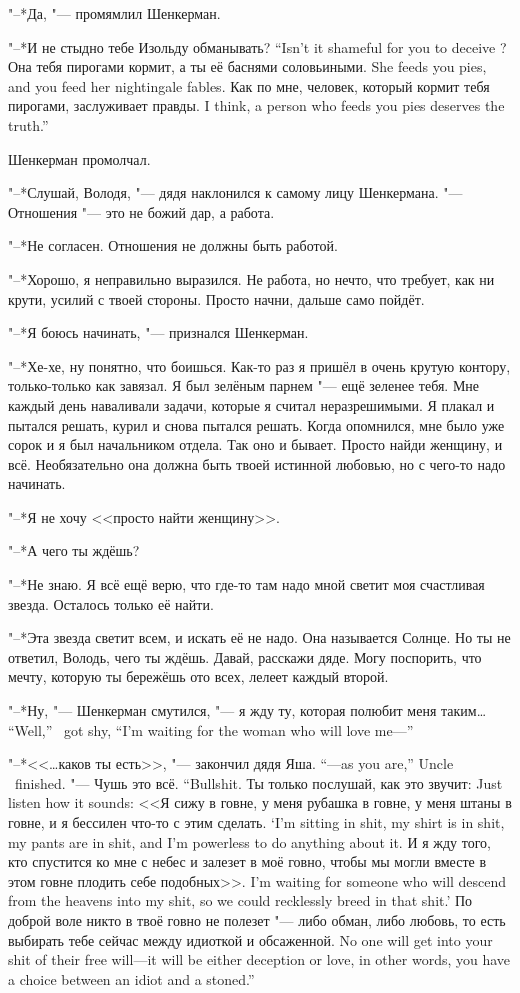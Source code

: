 "--*Да, "--- промямлил Шенкерман.

{"--*И не стыдно тебе Изольду обманывать?}
{``Isn't it shameful for you to deceive \Izolda?}
{Она тебя пирогами кормит, а ты её баснями соловьиными.}
{She feeds you pies, and you feed her nightingale fables.}
{Как по мне, человек, который кормит тебя пирогами, заслуживает правды.}
{I think, a person who feeds you pies deserves the truth.''}

Шенкерман промолчал.

"--*Слушай, Володя, "--- дядя наклонился к самому лицу Шенкермана.
"--- Отношения "--- это не божий дар, а работа.

"--*Не согласен.
Отношения не должны быть работой.

"--*Хорошо, я неправильно выразился.
Не работа, но нечто, что требует, как ни крути, усилий с твоей стороны.
Просто начни, дальше само пойдёт.

"--*Я боюсь начинать, "--- признался Шенкерман.

"--*Хе-хе, ну понятно, что боишься.
Как-то раз я пришёл в очень крутую контору, только-только как завязал.
Я был зелёным парнем "--- ещё зеленее тебя.
Мне каждый день наваливали задачи, которые я считал неразрешимыми.
Я плакал и пытался решать, курил и снова пытался решать.
Когда опомнился, мне было уже сорок и я был начальником отдела.
Так оно и бывает.
Просто найди женщину, и всё.
Необязательно она должна быть твоей истинной любовью, но с чего-то надо начинать.

"--*Я не хочу <<просто найти женщину>>.

"--*А чего ты ждёшь?

"--*Не знаю.
Я всё ещё верю, что где-то там надо мной светит моя счастливая звезда.
Осталось только её найти.

"--*Эта звезда светит всем, и искать её не надо.
Она называется Солнце.
Но ты не ответил, Володь, чего ты ждёшь.
Давай, расскажи дяде.
Могу поспорить, что мечту, которую ты бережёшь ото всех, лелеет каждый второй.

{"--*Ну, "--- Шенкерман смутился, "--- я жду ту, которая полюбит меня таким\dots}
{``Well,'' \Shenkerman\ got shy, ``I'm waiting for the woman who will love me---''}

{"--*<<\dots{}каков ты есть>>, "--- закончил дядя Яша.}
{``---as you are,'' Uncle \Yasha\ finished.}
{"--- Чушь это всё.}
{``Bullshit.}
{Ты только послушай, как это звучит:}
{Just listen how it sounds:}
{<<Я сижу в говне, у меня рубашка в говне, у меня штаны в говне, и я бессилен что-то с этим сделать.}
{`I'm sitting in shit, my shirt is in shit, my pants are in shit, and I'm powerless to do anything about it.}
{И я жду того, кто спустится ко мне с небес и залезет в моё говно, чтобы мы могли вместе в этом говне плодить себе подобных>>.}
{I'm waiting for someone who will descend from the heavens into my shit, so we could recklessly breed in that shit.'}
{По доброй воле никто в твоё говно не полезет "--- либо обман, либо любовь, то есть выбирать тебе сейчас между идиоткой и обсаженной.}
{No one will get into your shit of their free will---it will be either deception or love, in other words, you have a choice between an idiot and a stoned.''}

